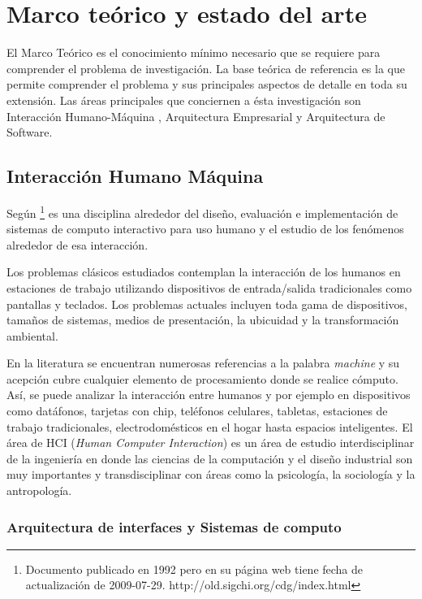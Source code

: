 
\chapter{Marco teórico y estado del arte}

El Marco Teórico es el conocimiento mínimo necesario que se requiere para comprender el problema de investigación. La base teórica de referencia es la que permite comprender el problema y sus principales aspectos de detalle en toda su extensión. Las áreas principales que conciernen a ésta investigación son Interacción Humano-Máquina \cite{sigchi1992curricula}, Arquitectura Empresarial y Arquitectura de Software.

\section{Interacción Humano Máquina}

Según \cite{sigchi1992curricula} \footnote{Documento publicado en 1992 pero en su página web tiene fecha de actualización de 2009-07-29. http://old.sigchi.org/cdg/index.html} es una disciplina alrededor del diseño, evaluación e implementación de sistemas de computo interactivo para uso humano y el estudio de los fenómenos alrededor de esa interacción.

Los problemas clásicos estudiados contemplan la interacción de los humanos en estaciones de trabajo utilizando dispositivos de entrada/salida tradicionales como pantallas y teclados. Los problemas actuales incluyen toda gama de dispositivos, tamaños de sistemas, medios de presentación, la ubicuidad y la transformación ambiental.

En la literatura se encuentran numerosas referencias a la palabra \textit{machine} y su acepción cubre cualquier elemento de procesamiento donde se realice cómputo. Así, se puede analizar la interacción entre humanos y por ejemplo en dispositivos como datáfonos, tarjetas con chip, teléfonos celulares, tabletas, estaciones de trabajo tradicionales, electrodomésticos en el hogar hasta espacios inteligentes. El área de HCI (\textit{Human Computer Interaction}) es un área de estudio interdisciplinar de la ingeniería en donde las ciencias de la computación y el diseño industrial son muy importantes y transdisciplinar con áreas como la psicología, la sociología y la antropología.

\subsection{Arquitectura de interfaces y Sistemas de computo}

